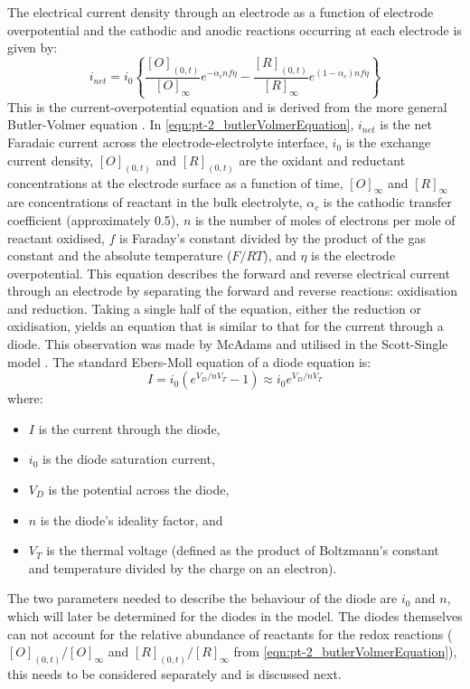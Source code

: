     The electrical current density through an electrode as a function of electrode overpotential and the cathodic and anodic reactions occurring at each electrode is given by:
    \begin{equation}
      i_{net} = i_{0} \left\{ \frac{[O]_{(0,t)}}{[O]_{\infty}}e^{-\alpha_{c}nf\eta} - \frac{[R]_{(0,t)}}{[R]_{\infty}}e^{(1-\alpha_{c})nf\eta}\right\}
      \label{eqn:pt-2_butlerVolmerEquation}
    \end{equation}
    This is the current-overpotential equation and is derived from the more general Butler-Volmer equation \cite{Merrill2005,ScottSingle2013}.
    In \cref{eqn:pt-2_butlerVolmerEquation}, $i_{net}$ is the net Faradaic current across the electrode-electrolyte interface,
    $i_{0}$ is the exchange current density,
    $[O]_{(0,t)}$ and $[R]_{(0,t)}$ are the oxidant and reductant concentrations at the electrode surface as a function of time,
    $[O]_{\infty}$ and $[R]_{\infty}$ are concentrations of reactant in the bulk electrolyte,
    $\alpha_{c}$ is the cathodic transfer coefficient (approximately 0.5),
    $n$ is the number of moles of electrons per mole of reactant oxidised,
    $f$ is Faraday's constant divided by the product of the gas constant and the absolute temperature ($F/RT$),
    and $\eta$ is the electrode overpotential.
    This equation describes the forward and reverse electrical current through an electrode by separating the forward and reverse reactions: oxidisation and reduction.
    Taking a single half of the equation, either the reduction or oxidisation, yields an equation that is similar to that for the current through a diode.
    This observation was made by McAdams and utilised in the Scott-Single model \cite{McAdams1995}.
    The standard Ebers-Moll equation of a diode equation is:
    \begin{equation}
      I = i_0\left(e^{V_D / n V_T}-1\right) \approx i_0 e^{V_D / n V_T}
      \label{eqn:pt-2_diodeEquation}
    \end{equation}
    where:
    \begin{itemize}
      \item $I$ is the current through the diode,
      \item $i_0$ is the diode saturation current,
      \item $V_D$ is the potential across the diode,
      \item $n$ is the diode's ideality factor, and
      \item $V_T$ is the thermal voltage (defined as the product of Boltzmann's constant and temperature divided by the charge on an electron).
    \end{itemize}
    The two parameters needed to describe the behaviour of the diode are $i_0$ and $n$, which will later be determined for the diodes in the model.
    The diodes themselves can not account for the relative abundance of reactants for the redox reactions ($[O]_{(0,t)}/[O]_{\infty}$ and $[R]_{(0,t)}/[R]_{\infty}$ from \cref{eqn:pt-2_butlerVolmerEquation}), this needs to be considered separately and is discussed next.


